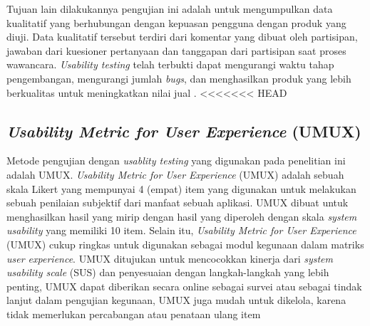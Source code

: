 \par Tujuan lain dilakukannya pengujian ini adalah untuk mengumpulkan data kualitatif yang berhubungan dengan kepuasan pengguna dengan produk yang diuji. Data kualitatif tersebut terdiri dari komentar yang dibuat oleh partisipan, jawaban dari kuesioner pertanyaan dan tanggapan dari partisipan saat proses wawancara. \textit{Usability testing} telah terbukti dapat mengurangi waktu tahap pengembangan, mengurangi jumlah \textit{bugs}, dan menghasilkan produk yang lebih berkualitas untuk meningkatkan nilai jual \citep{Wahl2000}.
<<<<<<< HEAD

\subsection{\textit{Usability Metric for User Experience} (UMUX)}
Metode pengujian dengan \textit{usablity testing} yang digunakan pada penelitian ini adalah UMUX. \textit{Usability Metric for User Experience} (UMUX) adalah sebuah skala Likert yang mempunyai 4 (empat) item yang digunakan untuk melakukan sebuah penilaian subjektif dari manfaat sebuah aplikasi. UMUX dibuat untuk menghasilkan hasil yang mirip dengan hasil yang diperoleh dengan skala \textit{system usability} yang memiliki 10 item. Selain itu, \textit{Usability Metric for User Experience} (UMUX) cukup ringkas untuk digunakan sebagai modul kegunaan dalam matriks \textit{user experience}. UMUX ditujukan untuk mencocokkan kinerja dari \textit{system usability scale} (SUS) dan penyesuaian dengan langkah-langkah yang lebih penting, UMUX dapat diberikan secara online sebagai survei atau sebagai tindak lanjut dalam pengujian kegunaan, UMUX juga mudah untuk dikelola, karena tidak memerlukan percabangan atau penataan ulang item \citep{Finstad2010}


